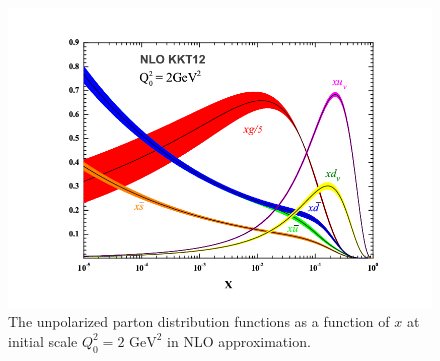 \documentclass[abstract = on,listof=totoc, bibliography=totoc]{scrreprt}
\begin{document}
\begin{figure}
\begin{center}
\includegraphics[width = .8\textwidth]{unpolDistFunct}
\caption[unpolarized parton distrubution function]{The unpolarized parton distribution functions as a function of $x$ at initial scale $Q^2_0 = 2 \text{ GeV}^2$ in NLO approximation.\cite{unpolDisFuncPic}}
\label{fig:f1}
\end{center}
\end{figure}

\FloatBarrier
\end{document}
